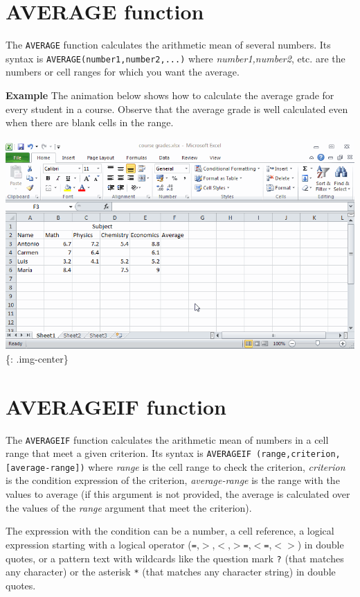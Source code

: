 \section{AVERAGE function}
\label{averagefunction}

The \texttt{AVERAGE} function calculates the arithmetic mean of several numbers. Its syntax is \texttt{AVERAGE(number1,number2,...)} where \emph{number1,number2}, etc. are the numbers or cell ranges for which you want the average. 

\textbf{Example} The animation below shows how to calculate the average grade for every student in a course. Observe that the average grade is well calculated even when there are blank cells in the range. 

\includegraphics[keepaspectratio,width=\textwidth,height=0.75\textheight]{img/example_function_average.gif}
\{: .img-center\}

\section{AVERAGEIF function}
\label{averageiffunction}

The \texttt{AVERAGEIF} function calculates the arithmetic mean of numbers in a cell range that meet a given criterion. Its syntax is \texttt{AVERAGEIF    (range,criterion,[average-range])} where \emph{range} is the cell range to check the criterion, \emph{criterion} is the condition expression of the criterion, \emph{average-range} is the range with the values to average (if this argument is not provided, the average is calculated over the values of the \emph{range} argument that meet the criterion). 

The expression with the condition can be a number, a cell reference, a logical expression starting with a logical operator (\texttt{=},\texttt{$>$},\texttt{$<$},\texttt{$>$=},\texttt{$<$=},\texttt{$<$$>$}) in double quotes, or a pattern text with wildcards like the question mark \texttt{?} (that matches any character) or the asterisk \texttt{*} (that matches any character string) in double quotes.

